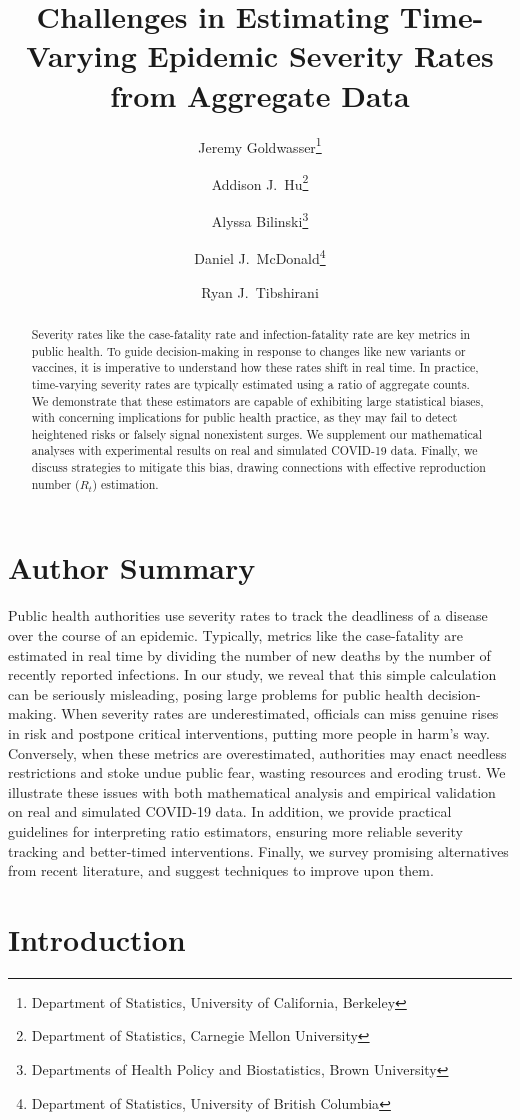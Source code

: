 \documentclass{article}
\title{Challenges in Estimating Time-Varying Epidemic Severity Rates from
  Aggregate Data}
\author{Jeremy Goldwasser\thanks{Department of Statistics, University of
    California, Berkeley} 
  \and  
  Addison J.\ Hu\thanks{Department of Statistics, Carnegie Mellon University}
  \and 
  Alyssa Bilinski\thanks{Departments of Health Policy and Biostatistics, Brown University} 
  \and
  Daniel J.\ McDonald\thanks{Department of Statistics, University of British
    Columbia} 
  \and 
  Ryan J.\ Tibshirani\footnotemark[1]}
\date{}
\begin{document}
\maketitle

\begin{abstract}
Severity rates like the case-fatality rate and infection-fatality rate are
key metrics in public health. To guide decision-making in response to changes
like new variants or vaccines, it is imperative to understand how these rates
shift in real time. In practice, time-varying severity rates are typically
estimated using a ratio of aggregate counts. We demonstrate that these
estimators are capable of exhibiting large statistical biases, with concerning
implications for public health practice, as they may fail to detect heightened 
risks or falsely signal nonexistent surges. We supplement our mathematical 
analyses with experimental results on real and simulated COVID-19 data. Finally,
we discuss strategies to mitigate this bias, drawing connections with
effective reproduction number ($R_t$) estimation.    
\end{abstract}

\section*{Author Summary}
Public health authorities use severity rates to track the deadliness of a disease over the course of an epidemic. 
Typically, metrics like the case-fatality are estimated in real time by dividing the number of new deaths by the number of recently reported infections. 
In our study, we reveal that this simple calculation can be seriously misleading, posing large problems for public health decision-making.
When severity rates are underestimated, officials can miss genuine rises in risk and postpone critical interventions, putting more people in harm’s way.
Conversely, when these metrics are overestimated, authorities may enact needless restrictions and stoke undue public fear, wasting resources and eroding trust.
We illustrate these issues with both mathematical analysis and empirical validation on real and simulated COVID-19 data. 
In addition, we provide practical guidelines for interpreting ratio estimators, ensuring more reliable severity tracking and better-timed interventions.
Finally, we survey promising alternatives from recent literature, and suggest techniques to improve upon them.

\section{Introduction}
\end{document}

